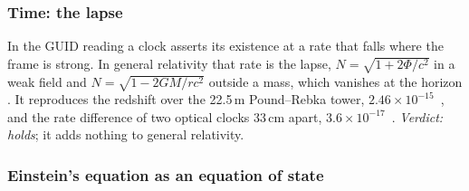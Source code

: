 \subsubsection{Time: the lapse}

In the GUID reading a clock asserts its existence at a rate that falls where the frame is strong. In general relativity that
rate is the lapse, $N=\sqrt{1+2\Phi/c^2}$ in a weak field and $N=\sqrt{1-2GM/rc^2}$ outside a mass, which vanishes at the horizon
. It reproduces the redshift over the 22.5\,m Pound--Rebka tower, $2.46\times10^{-15}$~\cite{pr60}, and the rate difference of two
optical clocks 33\,cm apart, $3.6\times10^{-17}$~\cite{chou}. \emph{Verdict: holds}; it adds nothing to general relativity.

\subsubsection{Einstein's equation as an equation of state}

